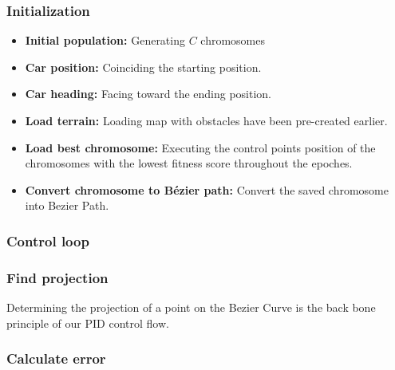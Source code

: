     \subsubsection{Initialization}
    \begin{itemize}
      \item \textbf{Initial population:} Generating $C$ chromosomes 
      \item \textbf{Car position:} Coinciding the starting position.
      \item \textbf{Car heading:} Facing toward the ending position.
      \item \textbf{Load terrain:} Loading map with obstacles have been pre-created earlier.
      \item \textbf{Load best chromosome:} Executing the control points position of the chromosomes with the lowest fitness score throughout the epoches.
      \item \textbf{Convert chromosome to Bézier path:} Convert the saved chromosome into Bezier Path.
    \end{itemize}
    \subsubsection{Control loop}
    \subsubsection*{Find projection}
    Determining the projection of a point on the Bezier Curve is the back bone principle of our PID control flow.

    \subsubsection*{Calculate error}
